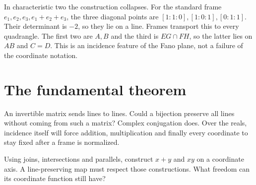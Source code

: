 In characteristic two the construction collapses. For the standard frame $e_1,e_2,e_3,e_1+e_2+e_3$, the three diagonal points are $[1:1:0],[1:0:1],[0:1:1]$. Their determinant is $-2$, so they lie on a line. Frames transport this to every quadrangle. The first two are $A,B$ and the third is $EG\cap FH$, so the latter lies on $AB$ and $C=D$. This is an incidence feature of the Fano plane, not a failure of the coordinate notation.

\section{The fundamental theorem}

An invertible matrix sends lines to lines. Could a bijection preserve all lines without coming from such a matrix? Complex conjugation does. Over the reals, incidence itself will force addition, multiplication and finally every coordinate to stay fixed after a frame is normalized.

\begin{think}
Using joins, intersections and parallels, construct $x+y$ and $xy$ on a coordinate axis. A line-preserving map must respect those constructions. What freedom can its coordinate function still have?
\end{think}

